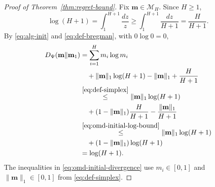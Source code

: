 \documentclass[journal]{IEEEtran}
\theoremstyle{remark}
\begin{document}
\begin{proof}[Proof of Theorem~\ref{thm:regret-bound}]
Fix $\mathbf{m}\in\mathcal{M}_H$. Since $H\ge1$,
\begin{equation}
\label{eq:omd-initial-log-bound}
\log(H+1)
=\int_1^{H+1}\frac{dz}{z}
\ge\int_1^{H+1}\frac{dz}{H+1}
=\frac{H}{H+1}.
\end{equation}
By \eqref{eq:alg-init} and \eqref{eq:def-bregman}, with $0\log0=0$,
\begin{equation}
\label{eq:omd-initial-divergence}
\begin{aligned}
D_\Psi(\mathbf{m}\|\mathbf{m}_1)
&=\sum_{i=1}^H m_i\log m_i \\
&\quad+\|\mathbf{m}\|_1\log(H+1)-\|\mathbf{m}\|_1
+\frac{H}{H+1}\\
&\overset{\eqref{eq:def-simplex}}{\le}
\|\mathbf{m}\|_1\log(H+1)\\
&\quad+(1-\|\mathbf{m}\|_1)\frac{H}{H+1}
-\frac{\|\mathbf{m}\|_1}{H+1}\\
&\overset{\eqref{eq:omd-initial-log-bound}}{\le}
\|\mathbf{m}\|_1\log(H+1)\\
&\quad+(1-\|\mathbf{m}\|_1)\log(H+1)\\
&=\log(H+1).
\end{aligned}
\end{equation}
The inequalities in \eqref{eq:omd-initial-divergence} use
$m_i\in[0,1]$ and $\|\mathbf{m}\|_1\in[0,1]$ from \eqref{eq:def-simplex}.


\end{proof}
\end{document}
